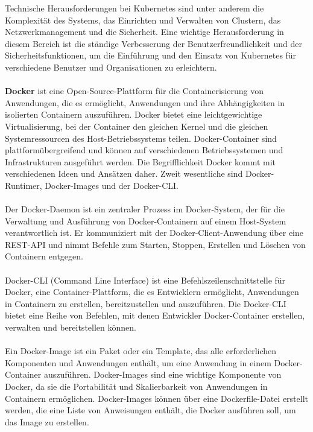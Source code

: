 \documentclass[../vs-script-first-v01.tex]{subfiles}
\begin{document}
Technische Herausforderungen bei Kubernetes sind unter anderem die Komplexität des Systems, das Einrichten und Verwalten von Clustern, das Netzwerkmanagement und die Sicherheit. Eine wichtige Herausforderung in diesem Bereich ist die ständige Verbesserung der Benutzerfreundlichkeit und der Sicherheitsfunktionen, um die Einführung und den Einsatz von Kubernetes für verschiedene Benutzer und Organisationen zu erleichtern.
\\\\
\textbf{Docker} ist eine Open-Source-Plattform für die Containerisierung von Anwendungen, die es ermöglicht, Anwendungen und ihre Abhängigkeiten in isolierten Containern auszuführen. Docker bietet eine leichtgewichtige Virtualisierung, bei der Container den gleichen Kernel und die gleichen Systemressourcen des Host-Betriebssystems teilen. Docker-Container sind plattformübergreifend und können auf verschiedenen Betriebssystemen und Infrastrukturen ausgeführt werden. Die Begrifflichkeit Docker kommt mit verschiedenen Ideen und Ansätzen daher. Zweit wesentliche sind Docker-Runtimer, Docker-Images und der Docker-CLI.
\\\\
Der Docker-Daemon ist ein zentraler Prozess im Docker-System, der für die Verwaltung und Ausführung von Docker-Containern auf einem Host-System verantwortlich ist. Er kommuniziert mit der Docker-Client-Anwendung über eine REST-API und nimmt Befehle zum Starten, Stoppen, Erstellen und Löschen von Containern entgegen.
\\\\
Docker-CLI (Command Line Interface) ist eine Befehlszeilenschnittstelle für Docker, eine Container-Plattform, die es Entwicklern ermöglicht, Anwendungen in Containern zu erstellen, bereitzustellen und auszuführen. Die Docker-CLI bietet eine Reihe von Befehlen, mit denen Entwickler Docker-Container erstellen, verwalten und bereitstellen können.
\\\\
Ein Docker-Image ist ein Paket oder ein Template, das alle erforderlichen Komponenten und Anwendungen enthält, um eine Anwendung in einem Docker-Container auszuführen. Docker-Images sind eine wichtige Komponente von Docker, da sie die Portabilität und Skalierbarkeit von Anwendungen in Containern ermöglichen. Docker-Images können über eine Dockerfile-Datei erstellt werden, die eine Liste von Anweisungen enthält, die Docker ausführen soll, um das Image zu erstellen.
\\\\
\end{document}
